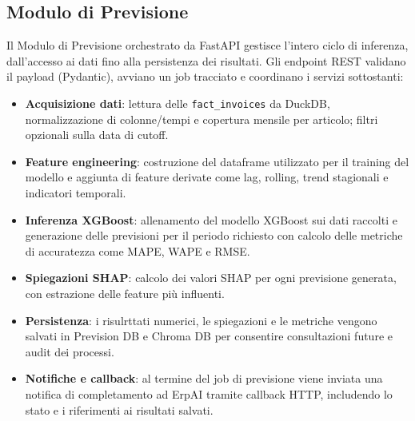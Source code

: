 \subsection{Modulo di Previsione}
Il Modulo di Previsione orchestrato da FastAPI gestisce l’intero ciclo di inferenza, dall’accesso ai dati fino alla persistenza dei risultati. Gli endpoint REST validano il payload (Pydantic), avviano un job tracciato e coordinano i servizi sottostanti:
\begin{itemize}
    \item \textbf{Acquisizione dati}: lettura delle \texttt{fact\_invoices} da DuckDB, normalizzazione di colonne/tempi e copertura mensile per articolo; filtri opzionali sulla data di cutoff.
    \item \textbf{Feature engineering}: costruzione del dataframe utilizzato per il training del modello e aggiunta di feature derivate come lag, rolling, trend stagionali e indicatori temporali.
    \item \textbf{Inferenza XGBoost}: allenamento del modello XGBoost sui dati raccolti e generazione delle previsioni per il periodo richiesto con calcolo delle metriche di accuratezza come MAPE, WAPE e RMSE.
    \item \textbf{Spiegazioni SHAP}: calcolo dei valori SHAP per ogni previsione generata, con estrazione delle feature più influenti.
    \item \textbf{Persistenza}: i risulrttati numerici, le spiegazioni e le metriche vengono salvati in Prevision DB e Chroma DB per consentire consultazioni future e audit dei processi.
    \item \textbf{Notifiche e callback}: al termine del job di previsione viene inviata una notifica di completamento ad ErpAI tramite callback HTTP, includendo lo stato e i riferimenti ai risultati salvati.
\end{itemize}

